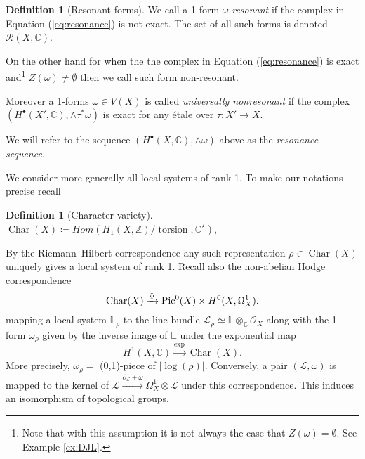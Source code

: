 \documentclass[11pt,reqno]{amsart}
\theoremstyle{definition}
\newtheorem{definition}[theorem]{Definition}
\theoremstyle{remark}
\theoremstyle{cited}
\theoremstyle{citeddef}
\newcommand{\C}{\mathbb{C}}
\DeclareMathOperator{\Char}{Char}
\def\Pic{{\rm Pic}}
\newcommand{\sL}{\mathcal{L}}
\newcommand{\sO}{\mathcal{O}}
\newcommand{\sR}{\mathcal{R}}
\newcommand{\bbC}{\mathbb{C}}
\newcommand{\bbL}{\mathbb{L}}
\newcommand{\bbZ}{\mathbb{Z}}
\DeclareMathOperator{\torsion}{torsion}
\begin{document}
\begin{definition}[Resonant forms]\label{def:resonance}
We call a 1-form $\omega$ \emph{resonant} if the complex 
in Equation (\ref{eq:resonance}) is not exact. The set of all such forms 
is denoted $\sR(X,\bbC)$.

On the other hand for when the the complex 
in Equation (\ref{eq:resonance}) is exact and\footnote{Note that
with this assumption it is not always the case that $Z(\omega) = \emptyset$. See Example \ref{ex:DJL}.} 
$Z(\omega) \neq \emptyset$ then we call such form non-resonant. 

Moreover a 1-forms $\omega\in V(X)$ is called \emph{universally nonresonant} if the complex
\newline $(H^{\bullet}(X',\bbC), \wedge\tau^*\omega)$
 is exact for any \'etale over $\tau\colon X'\to X$. 

We will refer to the sequence $(H^{\bullet}(X,\bbC), \wedge\omega)$ above as the \emph{resonance sequence}.
\end{definition}

We consider more generally all local systems of rank 1. To make our notations precise recall 
\begin{definition}[Character variety]
$\Char(X) \coloneqq Hom(H_1(X, \bbZ)/\torsion, \bbC^{\star})$, 
\end{definition}
By the Riemann--Hilbert correspondence any such representation $\rho\in \Char(X)$ 
uniquely gives a local system of rank 1. 
Recall also the non-abelian Hodge
correspondence
\[\Char(X) \xrightarrow{\Psi} \Pic^{0}(X)\times H^0(X,\Omega_X^1).\]
mapping a local system $\bbL_{\rho}$ to the line bundle $\sL_{\rho}\simeq \bbL\otimes_{\bbC}\sO_X$
along with the 1-form $\omega_{\rho}$ given by the inverse image of $\bbL$ under
the exponential map
\begin{equation}
H^1(X,\bbC) \xrightarrow{\exp} \Char(X).
\label{eq:exponential}
\end{equation}
More precisely, $\omega_{\rho} = $ (0,1)-piece of $|\log(\rho)|$. Conversely, a pair $(\sL, \omega)$ 
is mapped to the kernel of $\sL\xrightarrow{\partial_{\sL}+\omega} \Omega_X^1\otimes \sL$ under this correspondence.
This induces an isomorphism of topological groups.
\end{document}
